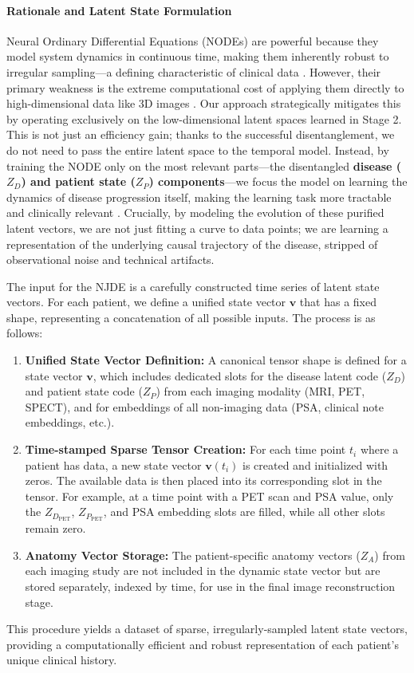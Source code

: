 \documentclass[11pt, a4paper]{article}
\begin{document}
\paragraph{Rationale and Latent State Formulation}
Neural Ordinary Differential Equations (NODEs) are powerful because they model system dynamics in continuous time, making them inherently robust to irregular sampling—a defining characteristic of clinical data \cite{GwakSim2020, JohnsonBulgarelli2023, BelogolovskyGreenberg2023}. However, their primary weakness is the extreme computational cost of applying them directly to high-dimensional data like 3D images \cite{WiewelBecher2018, DavisChoromanski2020}. Our approach strategically mitigates this by operating exclusively on the low-dimensional latent spaces learned in Stage 2. This is not just an efficiency gain; thanks to the successful disentanglement, we do not need to pass the entire latent space to the temporal model. Instead, by training the NODE only on the most relevant parts—the disentangled \textbf{disease ($Z_D$) and patient state ($Z_P$) components}—we focus the model on learning the dynamics of disease progression itself, making the learning task more tractable and clinically relevant \cite{AshmanSo2020, KberKalisch2023, LosadaTerranova2024}. Crucially, by modeling the evolution of these purified latent vectors, we are not just fitting a curve to data points; we are learning a representation of the underlying causal trajectory of the disease, stripped of observational noise and technical artifacts.

The input for the NJDE is a carefully constructed time series of latent state vectors. For each patient, we define a unified state vector $\mathbf{v}$ that has a fixed shape, representing a concatenation of all possible inputs. The process is as follows:
\begin{enumerate}
    \item \textbf{Unified State Vector Definition:} A canonical tensor shape is defined for a state vector $\mathbf{v}$, which includes dedicated slots for the disease latent code ($Z_D$) and patient state code ($Z_P$) from each imaging modality (MRI, PET, SPECT), and for embeddings of all non-imaging data (PSA, clinical note embeddings, etc.).
    \item \textbf{Time-stamped Sparse Tensor Creation:} For each time point $t_i$ where a patient has data, a new state vector $\mathbf{v}(t_i)$ is created and initialized with zeros. The available data is then placed into its corresponding slot in the tensor. For example, at a time point with a PET scan and PSA value, only the $Z_{D_{\text{PET}}}$, $Z_{P_{\text{PET}}}$, and PSA embedding slots are filled, while all other slots remain zero.
    \item \textbf{Anatomy Vector Storage:} The patient-specific anatomy vectors ($Z_A$) from each imaging study are not included in the dynamic state vector but are stored separately, indexed by time, for use in the final image reconstruction stage.
\end{enumerate}
This procedure yields a dataset of sparse, irregularly-sampled latent state vectors, providing a computationally efficient and robust representation of each patient's unique clinical history.
\end{document}
